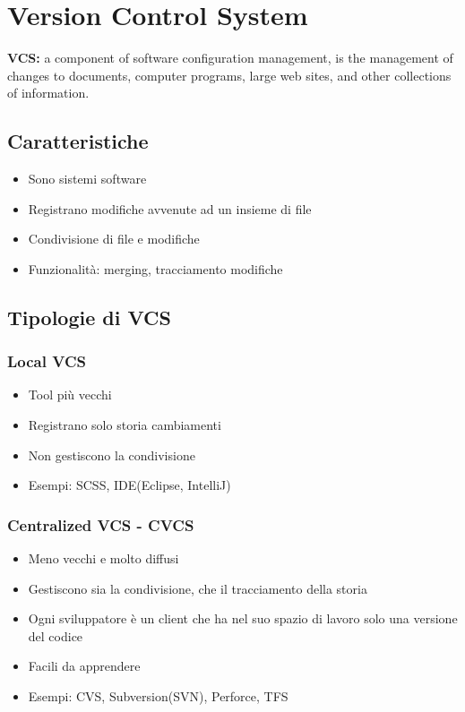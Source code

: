 \section{Version Control System}
\begin{mdframed}
    \textbf{VCS:} a component of software configuration management, is the management of changes to documents, computer programs, large web sites, and other collections of information.
\end{mdframed}

\subsection{Caratteristiche}
\begin{itemize}
    \item Sono sistemi software
    \item Registrano modifiche avvenute ad un insieme di file
    \item Condivisione di file e modifiche
    \item Funzionalità: merging, tracciamento modifiche
\end{itemize}

\subsection{Tipologie di VCS}

\subsubsection{Local VCS}
\begin{itemize}
    \item Tool più vecchi
    \item Registrano solo storia cambiamenti
    \item Non gestiscono la condivisione
    \item Esempi: SCSS, IDE(Eclipse, IntelliJ)
\end{itemize}

\subsubsection{Centralized VCS - CVCS}
\begin{itemize}
    \item Meno vecchi e molto diffusi
    \item Gestiscono sia la condivisione, che il tracciamento della storia
    \item Ogni sviluppatore è un client che ha nel suo spazio di lavoro solo una versione del codice
    \item Facili da apprendere
    \item Esempi: CVS, Subversion(SVN), Perforce, TFS
\end{itemize}

